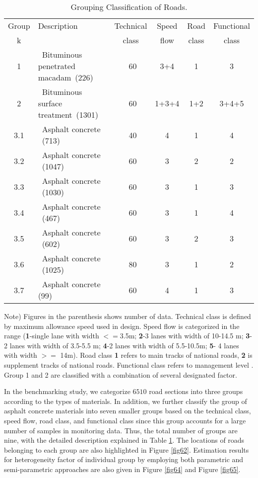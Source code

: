 \begin{table}[t]
\begin{center}
\caption{Grouping Classification of Roads.}
\label{table65}
{\footnotesize
\begin{tabular}{c|l|c|c|c|c}\hline
   Group& Description & Technical & Speed & Road & Functional  \\
      k  &   & class & flow & class & class \\\hline
   1 & ~Bituminous penetrated macadam~(226) & ~60 & 3+4 & 1 & 3   \\
   2 & ~Bituminous surface treatment~(1301) & ~60 & 1+3+4 & 1+2 & 3+4+5   \\
   3.1 & ~Asphalt concrete ~(713) & ~40 & 4 & 1 & 4   \\
   3.2 & ~Asphalt concrete ~(1047) & ~60 & 3 & 2 & 2  \\
   3.3 & ~Asphalt concrete ~(1030) & ~60 & 3 & 1 & 3  \\
   3.4 & ~Asphalt concrete ~(467) & ~60 & 3 & 1 & 4  \\
   3.5 & ~Asphalt concrete ~(602) & ~60 & 3 & 2 & 3    \\
   3.6 & ~Asphalt concrete ~(1025) & ~80 & 3 & 1 & 2   \\
   3.7 & ~Asphalt concrete (99)~ & ~60 & 4 & 1 & 3  \\
  \hline
\end{tabular}
}
\end{center}
\footnotesize Note) Figures in the parenthesis shows number of data. Technical class is defined by maximum allowance speed used in design. Speed flow is categorized in the range (\textbf{1}-single lane with width $<=$3.5m; \textbf{2}-3 lanes with width of 10-14.5 m; \textbf{3}-2 lanes with width of 3.5-5.5 m; \textbf{4}-2 lanes with width of 5.5-10.5m; \textbf{5}- 4 lanes with width $>=$ 14m). Road class \textbf{1} refers to main tracks of national roads, \textbf{2} is supplement tracks of national roads. Functional class refers to management level \cite{tcvn4054}. Group 1 and 2 are classified with a combination of several designated factor.
\end{table}

In the benchmarking study, we categorize $6510$ road sections into three groups according to the types of materials. In addition, we further classify the group of asphalt concrete materials into seven smaller groups based on the technical class, speed flow, road class, and functional class since this group accounts for a large number of samples in monitoring data. Thus, the total number of groups are nine, with the detailed description explained in Table \ref{table65}. The locations of roads belonging to each group are also highlighted in Figure \ref{fig62}. Estimation results for heterogeneity factor of individual group by employing both parametric and semi-parametric approaches are also given in Figure \ref{fig64} and Figure \ref{fig65}. 

